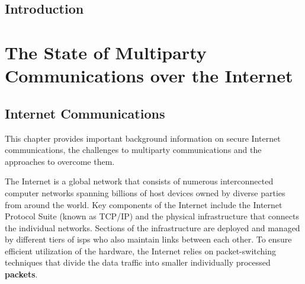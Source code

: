 \label{thesis__001-preamble.md}
\tableofcontents

\todototoc

\listoftodos

\printnoidxglossary[type=\acronymtype,title=Glossary]

\listoffigures

\mainmatter

\label{thesis__010-intro.md}
\chapter{Introduction}\label{thesis__010-intro.md__introduction}

\label{thesis__020-internet.md}
\part{The State of Multiparty Communications over the Internet}\label{thesis__020-internet.md__the-state-of-multiparty-communications-over-the-internet}


\chapter{Internet Communications}\label{thesis__020-internet.md__sec:internet}


This chapter provides important background information on secure Internet communications, the challenges to multiparty communications and the approaches to overcome them.

The Internet is a global network that consists of numerous interconnected computer networks spanning billions of host devices owned by diverse parties from around the world. Key components of the Internet include the Internet Protocol Suite (known as TCP/IP) and the physical infrastructure that connects the individual networks. Sections of the infrastructure are deployed and managed by different tiers of \glspl{isp} who also maintain links between each other. To ensure efficient utilization of the hardware, the Internet relies on packet-switching techniques that divide the data traffic into smaller individually processed \textbf{packets}.

